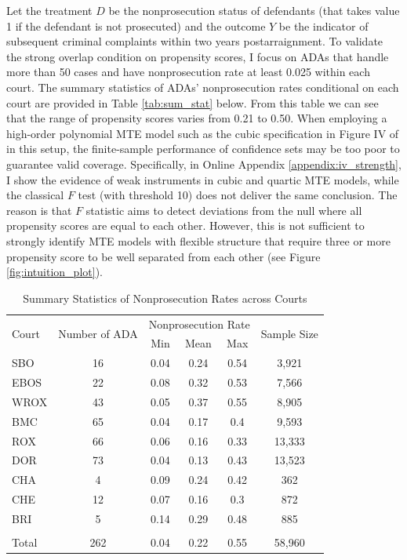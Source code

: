 \documentclass[11pt]{article}
\theoremstyle{definition}
\newcommand{\0}{\ensuremath{\mathbf{0}}}
\begin{document}
\begin{bibunit}
Let the treatment $D$ be the nonprosecution status of defendants (that takes value 1 if the defendant is not prosecuted) and the outcome $Y$ be the indicator of subsequent criminal complaints within two years postarraignment. To validate the strong overlap condition on propensity scores, I focus on ADAs that handle more than 50 cases and have nonprosecution rate at least 0.025 within each court. The summary statistics of ADAs' nonprosecution rates conditional on each court are provided in Table \ref{tab:sum_stat} below. From this table we can see that the range of propensity scores varies from 0.21 to 0.50. When employing a high-order polynomial MTE model such as the cubic specification in Figure IV of \cite{agan/doleac/harvey:2023} in this setup, the finite-sample performance of confidence sets may be too poor to guarantee valid coverage. Specifically, in Online Appendix \ref{appendix:iv_strength}, I show the evidence of weak instruments in cubic and quartic MTE models, while the classical $F$ test (with threshold 10) does not deliver the same conclusion. The reason is that $F$ statistic aims to detect deviations from the null where all propensity scores are equal to each other. However, this is not sufficient to strongly identify MTE models with flexible structure that require three or more propensity score to be well separated from each other (see Figure \ref{fig:intuition_plot}).
 
%
\begin{table}[htbp]
  \centering
  \caption{Summary Statistics of Nonprosecution Rates across Courts}
    \begin{tabular}{lccccc}
    \toprule
    \multirow{2}[2]{*}{Court} & \multirow{2}[2]{*}{Number of ADA} & \multicolumn{3}{c}{Nonprosecution Rate } & \multirow{2}[2]{*}{Sample Size} \\
          &       & Min   & Mean  & Max   &  \\
    \midrule
    SBO   & 16    & 0.04  & 0.24  & 0.54  & 3,921 \\
    EBOS  & 22    & 0.08  & 0.32  & 0.53  & 7,566 \\
    WROX  & 43    & 0.05  & 0.37  & 0.55  & 8,905 \\
    BMC   & 65    & 0.04  & 0.17  & 0.4   & 9,593 \\
    ROX   & 66    & 0.06  & 0.16  & 0.33  & 13,333 \\
    DOR   & 73    & 0.04  & 0.13  & 0.43  & 13,523 \\
    CHA   & 4     & 0.09  & 0.24  & 0.42  & 362 \\
    CHE   & 12    & 0.07  & 0.16  & 0.3   & 872 \\
    BRI   & 5     & 0.14  & 0.29  & 0.48  & 885 \\
          &       &       &       &       &  \\
    Total & 262   & 0.04  & 0.22  & 0.55  & 58,960 \\
    \bottomrule
    \end{tabular}%
    

\end{table}
\end{bibunit}
\end{document}
